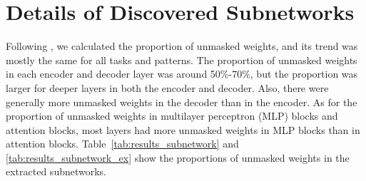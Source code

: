 \section{Details of Discovered Subnetworks}
\label{sec:results_subnetwork}



Following \citet{cao-etal-2021-low}, we calculated the proportion of unmasked weights, and its trend was mostly the same for all tasks and patterns.
The proportion of unmasked weights in each encoder and decoder layer was around 50\%-70\%, but the proportion was larger for deeper layers in both the encoder and decoder.
Also, there were generally more unmasked weights in the decoder than in the encoder.
As for the proportion of unmasked weights in multilayer perceptron (MLP) blocks and attention blocks, most layers had more unmasked weights in MLP blocks than in attention blocks.
Table~\ref{tab:results_subnetwork} and \ref{tab:results_subnetwork_ex} show the proportions of unmasked weights in the extracted subnetworks.

